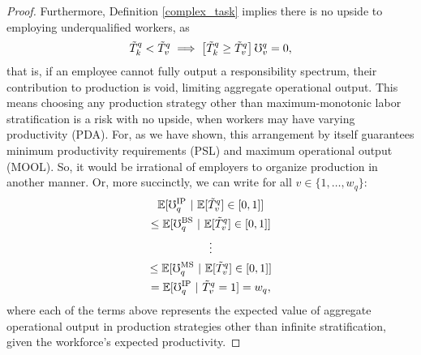 \documentclass[hidelinks, nonatbib]{elsarticle}
\begin{document}
\begin{lemma}
\begin{proof}
        Furthermore, Definition \ref{complex_task} implies there is no upside to employing underqualified workers, as 
        \begin{gather}
            \tilde{T}_{k}^{q}
            <
            \tilde{T}_{v}^{q}
            \implies
            \left[
                \tilde{T}_{k}^{q}
                \geq
                \tilde{T}_{v}^{q}
            \right]
            \mho_{v}^{q}
            =
            0
            ,
        \end{gather}
        that is, if an employee cannot fully output a responsibility spectrum, their contribution to production is void, limiting aggregate operational output. This means choosing any production strategy other than maximum-monotonic labor stratification is a risk with no upside, when workers may have varying productivity (PDA). For, as we have shown, this arrangement by itself guarantees minimum productivity requirements (PSL) and maximum operational output (MOOL). So, it would be irrational of employers to organize production in another manner. Or, more succinctly, we can write for all $v \in \{1, \dots, w_q\}$:
        \begin{gather}
            \mathbb{E}[
                \mho_{q}^{\text{IP}}
                \
                |
                \
                \mathbb{E}[
                    \tilde{T}_{v}^{q}
                ]
                \in [0,1]
            ]
            \\
            \leq
            \mathbb{E}[
                \mho_{q}^{\text{BS}}
                \
                |
                \
                \mathbb{E}[
                    \tilde{T}_{v}^{q}
                ]
                \in [0,1]
            ]
            \\
            \vdots
            \\
            \leq
            \mathbb{E}[
                \mho_{q}^{\text{MS}}
                \
                |
                \
                \mathbb{E}[
                    \tilde{T}_{v}^{q}
                ]
                \in [0,1]
            ]
            \\
            =
            \mathbb{E}[
                \mho_{q}^{\text{IP}}
                \
                |
                \
                \tilde{T}_{v}^{q}
                = 1
            ]
            =
            w_q
            ,
        \end{gather}
        where each of the terms above represents the expected value of aggregate operational output in production strategies other than infinite stratification, given the workforce's expected productivity.


\end{proof}
\end{lemma}
\end{document}
